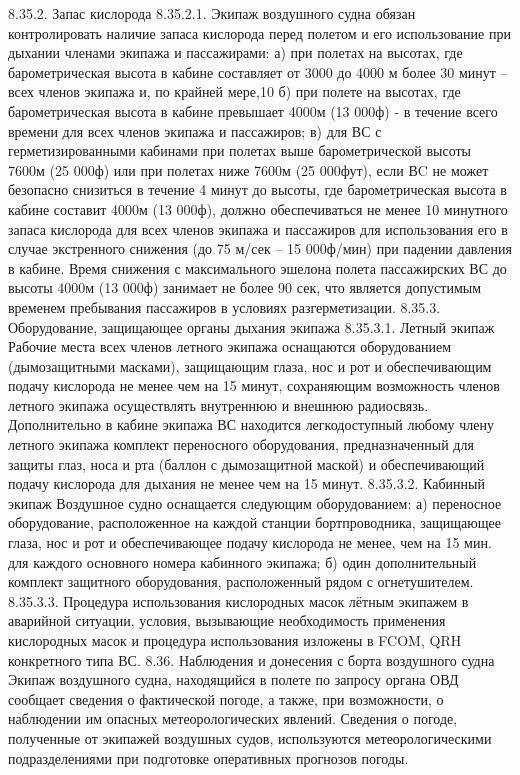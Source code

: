 8.35.2.	Запас кислорода 
8.35.2.1. Экипаж воздушного судна обязан контролировать наличие запаса кислорода перед полетом и его использование при дыхании членами экипажа и пассажирами:
а)	при полетах на высотах, где барометрическая высота в кабине составляет от 3000 до 4000 м более 30 минут – всех членов экипажа и, по крайней мере,10%
б)	при полете на высотах, где барометрическая высота в кабине превышает 4000м (13 000ф) - в течение всего времени для всех членов экипажа и пассажиров;
в)	для ВС с герметизированными кабинами при полетах выше барометрической высоты 7600м (25 000ф) или при полетах ниже 7600м (25 000фут), если ВC не может безопасно снизиться в течение 4 минут до высоты, где барометрическая высота в кабине составит 4000м (13 000ф), должно обеспечиваться не менее 10 минутного запаса кислорода для всех членов экипажа и пассажиров для использования его в случае экстренного снижения (до 75 м/сек – 15 000ф/мин) при падении давления в кабине.
Время снижения с максимального эшелона полета пассажирских ВС до высоты 4000м (13 000ф) занимает не более 90 сек, что является допустимым временем пребывания пассажиров в условиях разгерметизации.
8.35.3.	Оборудование, защищающее органы дыхания экипажа
8.35.3.1.	Летный экипаж
Рабочие места всех членов летного экипажа оснащаются оборудованием (дымозащитными масками), защищающим глаза, нос и рот и обеспечивающим подачу кислорода не менее чем на 15 минут, сохраняющим возможность членов летного экипажа осуществлять внутреннюю и внешнюю радиосвязь.
Дополнительно в кабине экипажа ВС находится легкодоступный любому члену летного экипажа комплект переносного оборудования, предназначенный для защиты глаз, носа и рта (баллон с дымозащитной маской) и обеспечивающий подачу кислорода для дыхания не менее чем на 15 минут.
8.35.3.2.	Кабинный экипаж
Воздушное судно оснащается следующим оборудованием:
а)	переносное оборудование, расположенное на каждой станции бортпроводника, защищающее глаза, нос и рот и обеспечивающее подачу кислорода не менее, чем на 15 мин. для каждого основного номера кабинного экипажа;
б)	один дополнительный комплект защитного оборудования, расположенный рядом с огнетушителем.
8.35.3.3. Процедура использования кислородных масок лётным экипажем в аварийной ситуации, условия, вызывающие необходимость применения кислородных масок и процедура использования изложены в FCOM, QRH конкретного типа ВС.
8.36.	Наблюдения и донесения с борта воздушного судна
Экипаж воздушного судна, находящийся в полете по запросу органа ОВД сообщает сведения о фактической погоде, а также, при возможности, о наблюдении им опасных метеорологических явлений. Сведения о погоде, полученные от экипажей воздушных судов, используются метеорологическими подразделениями при подготовке оперативных прогнозов погоды.

